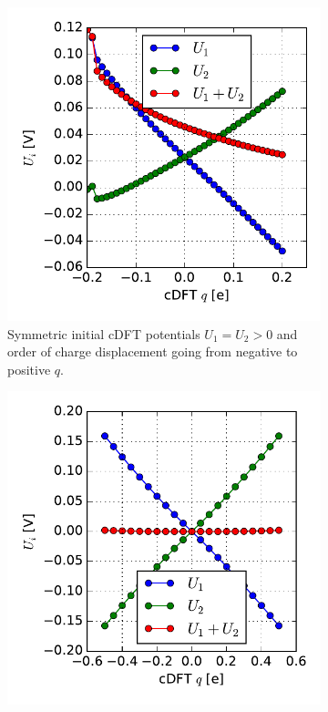 \begin{figure}
	\centering
	\begin{subfigure}{0.45\textwidth}
	\centering
	\includegraphics[width = \textwidth]{Images/polyacetylene/charging/potential_q_asymmetric}
	\caption{Symmetric initial cDFT potentials \mbox{$U_1 = U_2 > 0$} and order of charge displacement going from negative to  positive $q$.}
	\label{}
	\end{subfigure}\hspace*{.5cm}
	\begin{subfigure}{0.45\textwidth}
	\centering
	\includegraphics[width = \textwidth]{Images/polyacetylene/charging/potential_q_1}

\end{subfigure}
\end{figure}
